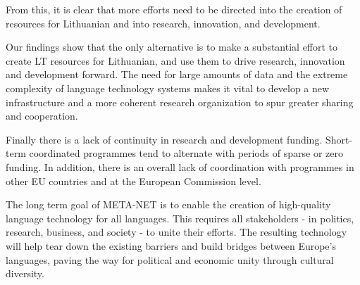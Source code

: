\begin{multicols}{2}
    From this, it is clear that more efforts need to be directed into the creation of resources for Lithuanian and into research, innovation, and development. 

    Our findings show that the only alternative is to make a substantial effort to create LT resources for Lithuanian, and use them to drive  research, innovation and development forward. The need for large amounts of data and the extreme complexity of language technology systems makes it vital to develop a new infrastructure and a more coherent research organization to spur greater sharing and cooperation.

Finally there is a lack of continuity in research and development funding. Short-term coordinated programmes tend to alternate with periods of sparse or zero funding. In addition, there is an overall lack of coordination with programmes in other EU countries and at the European Commission level.

The long term goal of META-NET is to enable the creation of high-quality language technology for all languages. This requires all stakeholders - in politics, research, business, and society - to unite their efforts. The resulting technology will help tear down the existing barriers and build bridges between Europe’s languages, paving the way for political and economic unity through cultural diversity. 


\end{multicols}
